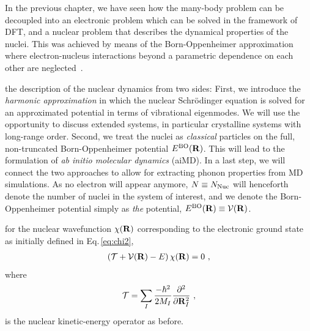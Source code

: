 \label{chp:dynamics}
In the previous chapter, we have seen how the many-body problem can be decoupled into an electronic problem %
which can be solved in the framework of DFT, and a nuclear problem %
that describes the dynamical properties of the nuclei. This was achieved by means of the Born-Oppenheimer approximation where electron-nucleus interactions beyond a parametric dependence on each other are neglected~\cite{BornOppenheimer}.

 the description of the nuclear dynamics from two sides: First, we introduce the \emph{harmonic approximation} in which the nuclear Schr\"odinger equation is solved for an approximated potential in terms of vibrational eigenmodes. We will use the opportunity to discuss extended systems, in particular crystalline systems with long-range order.
Second, we treat the nuclei as \emph{classical} particles on the full, non-truncated Born-Oppenheimer potential $E^{\rm BO} ({\bf R})$. This will lead to the formulation of \emph{ab initio molecular dynamics} (aiMD). In a last step, we will connect the two approaches to allow for extracting phonon properties from MD simulations.
As no electron will appear anymore, $N \equiv N_{\rm Nuc}$ will henceforth denote the number of nuclei in the system of interest, and we denote the Born-Oppenheimer potential simply as \emph{the} potential, $E^{\rm BO} ({\bf R}) \equiv \mathcal V ({\bf R})$.

 for the nuclear wavefunction $\chi ({\bf R})$ corresponding to the electronic ground state as initially defined in Eq.\,\eqref{eq:chi2},
\begin{align}
\left( \mathcal T + \mathcal V ({\bf R}) - E \right) \chi ({\bf R})
= 0~,
\label{eq:BOSE}
\end{align}
where
\begin{align}
\mathcal  T
= \sum_I \frac{- \hbar^2}{2 M_I} \frac{\partial^2}{\partial {\bf R}_I^2}~,
\label{eq:Tnuc2}
\end{align}
is the nuclear kinetic-energy operator as before.

\newpage
